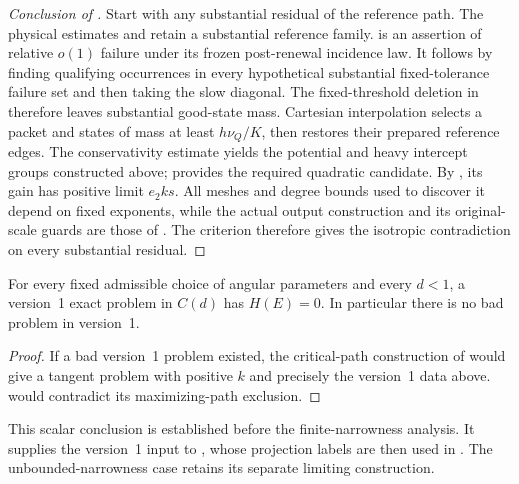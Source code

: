 \begin{proof}[Conclusion of ]
Start with any substantial residual of the reference path.
The physical estimates and  retain a
substantial reference family.  is an
assertion of relative \(o(1)\) failure under its frozen
post-renewal incidence law. It follows by finding qualifying
occurrences in every hypothetical substantial fixed-tolerance
failure set and then taking the slow diagonal.
The fixed-threshold deletion in 
therefore leaves substantial good-state mass. Cartesian
interpolation selects a packet and states of mass
at least \(h\nu_Q/K\), then restores their prepared reference
edges. The conservativity estimate yields the potential and
heavy intercept groups constructed above; 
provides the required quadratic candidate. By
, its gain has positive limit
\(e_2ks\). All meshes and degree bounds used to discover it
depend on fixed exponents, while the actual output construction
and its original-scale guards are those of
. The criterion therefore gives
the isotropic contradiction on every substantial residual.
\end{proof}

\begin{corollary}
\label{a05:scalar-zero-horizon}
For every fixed admissible choice of angular parameters and every
\(d<1\), a version~1 exact problem in \(C(d)\) has
\(H(E)=0\). In particular there is no bad problem in version~1.
\end{corollary}

\begin{proof}
If a bad version~1 problem existed, the critical-path construction
of  would give a tangent problem with
positive \(k\) and precisely the version~1 data above.
 would
contradict its maximizing-path exclusion.
\end{proof}

This scalar conclusion is established before the finite-narrowness
analysis. It supplies the version~1 input to
, whose projection labels are then
used in .
The unbounded-narrowness case retains its separate limiting construction.
